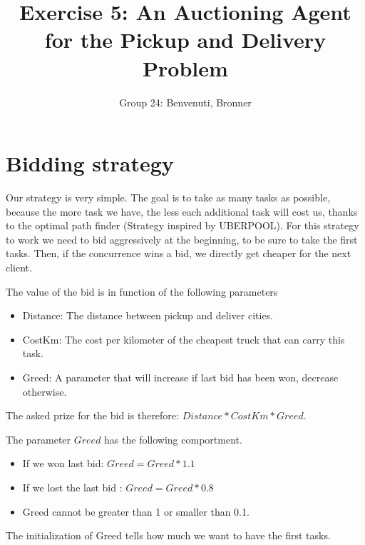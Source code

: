 \documentclass[11pt]{article}
\title{\bf Exercise 5: An Auctioning Agent for the Pickup and Delivery Problem}
\author{Group 24: Benvenuti, Bronner}
\begin{document}
\maketitle

\section{Bidding strategy}
Our strategy is very simple. The goal is to take as many tasks as possible, because the more task we have, the less each additional task will cost us, thanks to the optimal path finder (Strategy inspired by UBERPOOL). For this strategy to work we need to bid aggressively at the beginning, to be sure to take the first tasks. Then, if the concurrence wins a bid, we directly get cheaper for the next client.

The value of the bid is in function of the following parameters
\begin{itemize}
  \item Distance: The distance between pickup and deliver cities.
  \item CostKm: The cost per kilometer of the cheapest truck that can carry this task.
  \item Greed: A parameter that will increase if last bid has been won, decrease otherwise. 
\end{itemize}

The asked prize for the bid is therefore: $Distance * CostKm * Greed$. 

The parameter $Greed$ has the following comportment.
\begin{itemize}
  \item If we won last bid: $Greed = Greed * 1.1$
  \item If we lost the last bid : $Greed = Greed * 0.8$
  \item Greed cannot be greater than 1 or smaller than 0.1.
\end{itemize}
The initialization of Greed tells how much we want to have the first tasks. 
\end{document}
